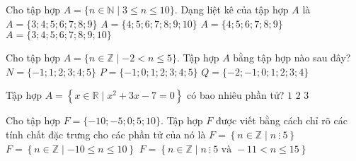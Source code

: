 \begin{ex}%
	Cho tập hợp $A = \{n \in \mathbb{N} \mid 3 \le n \le 10\}$. Dạng liệt kê của tập hợp $A$ là 
	\choice
	{$A = \{3;4;5;6;7;8;9\}$}
	{$A = \{4;5;6;7;8;9;10\}$}
	{$A = \{4;5;6;7;8;9\}$}
	{\True $A = \{3;4;5;6;7;8;9;10\}$}
\end{ex}

\begin{ex}%
	Cho tập hợp $A = \{n \in \mathbb{Z} \mid -2 < n \le 5\}$. Tập hợp $A$ bằng tập hợp nào sau đây?
	{$N = \{-1; 1;2;3;4; 5 \}$}
	{\True $P = \{-1;0;1;2;3;4;5 \}$}
	{$Q = \{-2;-1; 0; 1;2;3;4 \}$}
\end{ex}

\begin{ex}%
	Tập hợp $A = \left \{x \in \mathbb{R}\mid x^2+3x-7=0 \right\}$ có bao nhiêu phần tử?
	{$1$}
	{\True  $2$}
	{$3$}
\end{ex}

\begin{ex}%
	Cho tập hợp $F = \{-10;-5;0;5;10\}$. Tập hợp $F$ được viết bằng cách chỉ rõ các tính chất đặc trưng cho các phần tử của nó là
	{$F= \left\{ n \in \mathbb{Z} \mid n\ \vdots\ 5 \right\} $}
	{$F= \left\{ n \in \mathbb{Z} \mid -10 \le n \le 10 \right\} $}
	{$F= \left\{ n \in \mathbb{Z} \mid n\ \vdots\ 5 \text{ và } -11 <  n \le 15 \right\} $}
\end{ex}

